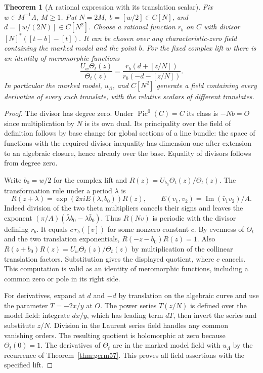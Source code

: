 \documentclass[a4paper,11pt]{article}
\newtheorem{theorem}[proposition]{Theorem}
\theoremstyle{definition}
\theoremstyle{remark}
\numberwithin{equation}{section}
\begin{document}
\begin{theorem}[A rational expression with its translation scalar]\leavevmode
\label{thm:divisionphase493}
Fix \(w\in M^{-1}\Lambda,\ M\ge1\). Put \(N=2M\),
\(b=[w/2]\in C[N]\), and \(d=[w/(2N)]\in C[N^2]\).
Choose a rational function \(r_b\) on \(C\) with divisor
\([N]^*([t-b]-[t])\). It can be chosen over any characteristic-zero
field containing the marked model and the point \(b\).
For the fixed complex lift \(w\) there is an identity of
meromorphic functions
\[
 \frac{U_w\Theta_t(z)}{\Theta_t(z)}
       =\frac{r_b(d+[z/N])}{r_b(-d-[z/N])}.
\]
In particular the marked model, \(u_\Lambda\), and \(C[N^2]\)
generate a field containing every derivative of every such
translate, with the relative scalars of different translates.
\end{theorem}
\begin{proof}
The divisor has degree zero. Under \(\operatorname{Pic}^0(C)=C\)
its class is \(-Nb=O\) since multiplication by \(N\) is its own
dual. Its principality over the field of definition follows by
base change for global sections of a line bundle: the space
of functions with the required divisor inequality has dimension
one after extension to an algebraic closure, hence already over
the base. Equality of divisors follows from degree zero.

Write \(b_0=w/2\) for the complex lift and
\(R(z)=U_{b_0}\Theta_t(z)/\Theta_t(z)\).
The transformation rule under a period \(\lambda\) is
\[
 R(z+\lambda)=\exp(2\pi i E(\lambda,b_0))R(z),
       \qquad E(v_1,v_2)=\operatorname{Im}(\bar v_1v_2)/A .
\]
Indeed division of the two theta multipliers cancels their
signs and leaves the exponent
\((\pi/A)(\bar\lambda b_0-\lambda\bar b_0)\).
Thus \(R(Nv)\) is periodic with the divisor defining \(r_b\).
It equals \(c\,r_b([v])\) for some nonzero constant \(c\).
By evenness of \(\Theta_t\) and the two translation exponentials,
\(R(-z-b_0)R(z)=1\). Also \(R(z+b_0)R(z)=
U_w\Theta_t(z)/\Theta_t(z)\) by multiplication of the collinear
translation factors. Substitution gives the displayed quotient,
where \(c\) cancels. This computation is valid as an identity
of meromorphic functions, including a common zero or pole in its
right side.

For derivatives, expand at \(d\) and \(-d\) by translation on
the algebraic curve and use the parameter \(T=-2x/y\) at \(O\).
The power series \(T(z/N)\) is defined over the model field:
integrate \(dx/y\), which has leading term \(dT\), then invert
the series and substitute \(z/N\). Division in the Laurent
series field handles any common vanishing orders. The resulting
quotient is holomorphic at zero because \(\Theta_t(0)=1\).
The derivatives of \(\Theta_t\) are in the marked model field
with \(u_\Lambda\) by the recurrence of Theorem~\ref{thm:germ57}.
This proves all field assertions with the specified lift.
\end{proof}
\end{document}

